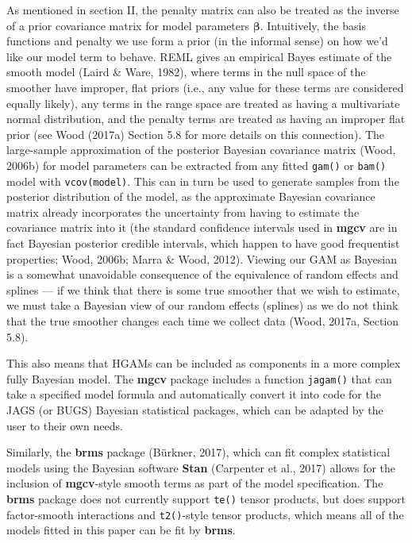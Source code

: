 \documentclass[12pt]{article}
\begin{document}
As mentioned in section II, the penalty matrix can also be treated as
the inverse of a prior covariance matrix for model parameters
\(\boldsymbol{\beta}\). Intuitively, the basis functions and penalty we
use form a prior (in the informal sense) on how we'd like our model term
to behave. REML gives an empirical Bayes estimate of the smooth model
(Laird \& Ware, 1982), where terms in the null space of the smoother
have improper, flat priors (i.e., any value for these terms are
considered equally likely), any terms in the range space are treated as
having a multivariate normal distribution, and the penalty terms are
treated as having an improper flat prior (see Wood (2017a) Section 5.8
for more details on this connection). The large-sample approximation of
the posterior Bayesian covariance matrix (Wood, 2006b) for model
parameters can be extracted from any fitted \texttt{gam()} or
\texttt{bam()} model with \texttt{vcov(model)}. This can in turn be used
to generate samples from the posterior distribution of the model, as the
approximate Bayesian covariance matrix already incorporates the
uncertainty from having to estimate the covariance matrix into it (the
standard confidence intervals used in \textbf{mgcv} are in fact Bayesian
posterior credible intervals, which happen to have good frequentist
properties; Wood, 2006b; Marra \& Wood, 2012). Viewing our GAM as
Bayesian is a somewhat unavoidable consequence of the equivalence of
random effects and splines --- if we think that there is some true
smoother that we wish to estimate, we must take a Bayesian view of our
random effects (splines) as we do not think that the true smoother
changes each time we collect data (Wood, 2017a, Section 5.8).

This also means that HGAMs can be included as components in a more
complex fully Bayesian model. The \textbf{mgcv} package includes a
function \texttt{jagam()} that can take a specified model formula and
automatically convert it into code for the JAGS (or BUGS) Bayesian
statistical packages, which can be adapted by the user to their own
needs.

Similarly, the \textbf{brms} package (Bürkner, 2017), which can fit
complex statistical models using the Bayesian software \textbf{Stan}
(Carpenter et al., 2017) allows for the inclusion of \textbf{mgcv}-style
smooth terms as part of the model specification. The \textbf{brms}
package does not currently support \texttt{te()} tensor products, but
does support factor-smooth interactions and \texttt{t2()}-style tensor
products, which means all of the models fitted in this paper can be fit
by \textbf{brms}.
\end{document}
